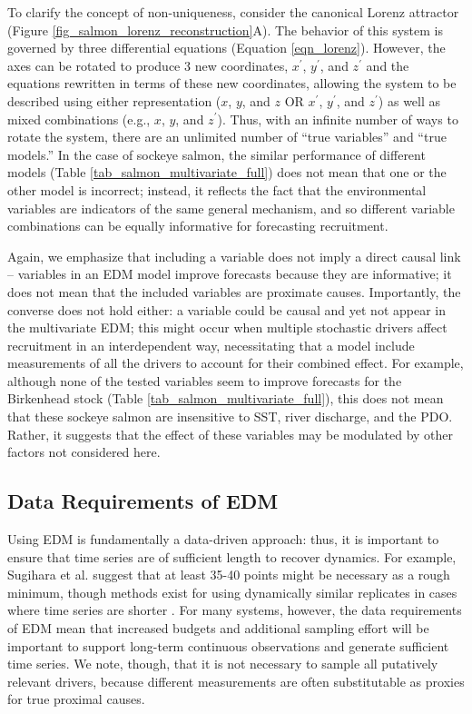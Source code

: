 To clarify the concept of non-uniqueness, consider the canonical Lorenz attractor (Figure \ref{fig_salmon_lorenz_reconstruction}A). The behavior of this system is governed by three differential equations (Equation \ref{eqn_lorenz}). However, the axes can be rotated to produce 3 new coordinates, $x^\prime$, $y^\prime$, and $z^\prime$ and the equations rewritten in terms of these new coordinates, allowing the system to be described using either representation ($x$, $y$, and $z$ OR $x^\prime$, $y^\prime$, and $z^\prime$) as well as mixed combinations (e.g., $x$, $y$, and $z^\prime$). Thus, with an infinite number of ways to rotate the system, there are an unlimited number of ``true variables'' and ``true models.'' In the case of sockeye salmon, the similar performance of different models (Table \ref{tab_salmon_multivariate_full}) does not mean that one or the other model is incorrect; instead, it reflects the fact that the environmental variables are indicators of the same general mechanism, and so different variable combinations can be equally informative for forecasting recruitment.

Again, we emphasize that including a variable does not imply a direct causal link -- variables in an EDM model improve forecasts because they are informative; it does not mean that the included variables are proximate causes. Importantly, the converse does not hold either: a variable could be causal and yet not appear in the multivariate EDM; this might occur when multiple stochastic drivers affect recruitment in an interdependent way, necessitating that a model include measurements of all the drivers to account for their combined effect. For example, although none of the tested variables seem to improve forecasts for the Birkenhead stock (Table \ref{tab_salmon_multivariate_full}), this does not mean that these sockeye salmon are insensitive to SST, river discharge, and the PDO. Rather, it suggests that the effect of these variables may be modulated by other factors not considered here.

\subsection{Data Requirements of EDM}

Using EDM is fundamentally a data-driven approach: thus, it is important to ensure that time series are of sufficient length to recover dynamics. For example, Sugihara et al. \cite{Sugihara_2012} suggest that at least 35-40 points might be necessary as a rough minimum, though methods exist for using dynamically similar replicates in cases where time series are shorter \cite{Hsieh_2008}. For many systems, however, the data requirements of EDM mean that increased budgets and additional sampling effort will be important to support long-term continuous observations and generate sufficient time series. We note, though, that it is not necessary to sample all putatively relevant drivers, because different measurements are often substitutable as proxies for true proximal causes.

